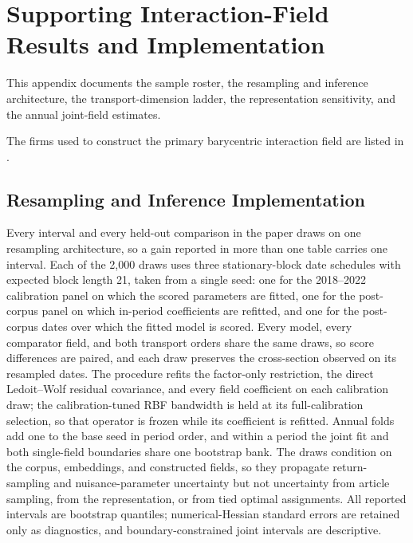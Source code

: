 \section{Supporting Interaction-Field Results and Implementation}
\label{sec:supporting-results}

This appendix documents the sample roster, the resampling and inference
architecture, the transport-dimension ladder, the representation sensitivity,
and the annual joint-field estimates.

The firms used to construct the primary barycentric interaction field are
listed in .



\subsection{Resampling and Inference Implementation}
\label{sec:app-inference}\label{sec:p5-two-field-implementation}

Every interval and every held-out comparison in the paper draws on one
resampling architecture, so a gain reported in more than one table carries one
interval.
Each of the 2,000 draws uses three stationary-block date schedules with
expected block length 21, taken from a single seed: one for the 2018--2022
calibration panel on which the scored parameters are fitted, one for the
post-corpus panel on which in-period coefficients are refitted, and one for the
post-corpus dates over which the fitted model is scored.
Every model, every comparator field, and both transport orders share the same
draws, so score differences are paired, and each draw preserves the
cross-section observed on its resampled dates.
The procedure refits the factor-only restriction, the direct Ledoit--Wolf
residual covariance, and every field coefficient on each calibration draw; the
calibration-tuned RBF bandwidth is held at its full-calibration selection, so
that operator is frozen while its coefficient is refitted.
Annual folds add one to the base seed in period order, and within a period the
joint fit and both single-field boundaries share one bootstrap bank.
The draws condition on the corpus, embeddings, and constructed fields, so they
propagate return-sampling and nuisance-parameter uncertainty but not
uncertainty from article sampling, from the representation, or from tied
optimal assignments.
All reported intervals are bootstrap quantiles; numerical-Hessian standard
errors are retained only as diagnostics, and boundary-constrained joint
intervals are descriptive.

